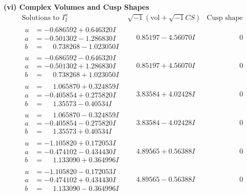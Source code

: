 \documentclass[1p]{elsarticle_modified}
\theoremstyle{definition}
\newcommand{\I}{\sqrt{-1}}
\begin{document}
\newpage\flushleft \textbf{(vi) Complex Volumes and Cusp Shapes}
$$\begin{array}{c|c|c}  
\text{Solutions to }I^u_{2}& \I (\text{vol} + \sqrt{-1}CS) & \text{Cusp shape}\\
 \hline 
\begin{aligned}
u &= -0.686592 + 0.646320 I \\
a &= -0.501302 - 1.286830 I \\
b &= \phantom{-}0.738268 - 1.023050 I\end{aligned}
 & \phantom{-}0.85197 - 4.56070 I & \phantom{-0.000000 } 0 \\ \hline\begin{aligned}
u &= -0.686592 - 0.646320 I \\
a &= -0.501302 + 1.286830 I \\
b &= \phantom{-}0.738268 + 1.023050 I\end{aligned}
 & \phantom{-}0.85197 + 4.56070 I & \phantom{-0.000000 } 0 \\ \hline\begin{aligned}
u &= \phantom{-}1.065870 + 0.324859 I \\
a &= -0.405854 + 0.275820 I \\
b &= \phantom{-}1.35573 - 0.40534 I\end{aligned}
 & \phantom{-}3.83584 + 4.02428 I & \phantom{-0.000000 } 0 \\ \hline\begin{aligned}
u &= \phantom{-}1.065870 - 0.324859 I \\
a &= -0.405854 - 0.275820 I \\
b &= \phantom{-}1.35573 + 0.40534 I\end{aligned}
 & \phantom{-}3.83584 - 4.02428 I & \phantom{-0.000000 } 0 \\ \hline\begin{aligned}
u &= -1.105820 + 0.172053 I \\
a &= -0.474102 - 0.434430 I \\
b &= \phantom{-}1.133090 + 0.364996 I\end{aligned}
 & \phantom{-}4.89565 + 0.56388 I & \phantom{-0.000000 } 0 \\ \hline\begin{aligned}
u &= -1.105820 - 0.172053 I \\
a &= -0.474102 + 0.434430 I \\
b &= \phantom{-}1.133090 - 0.364996 I\end{aligned}
 & \phantom{-}4.89565 - 0.56388 I & \phantom{-0.000000 } 0 \\ \hline\begin{aligned}

\end{aligned}
\end{array}$$
\end{document}
